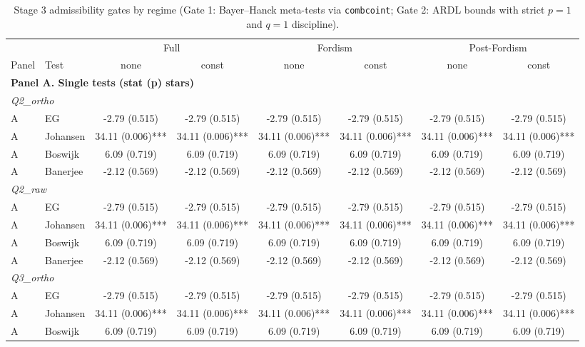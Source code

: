 \begin{table}[!ht]
\centering
\caption{Stage 3 admissibility gates by regime (Gate 1: Bayer--Hanck meta-tests via \texttt{combcoint}; Gate 2: ARDL bounds with strict $p=1$ and $q=1$ discipline).}
\label{tab:stage3_admissibility}
\scriptsize
\setlength{\tabcolsep}{3pt}
\begin{tabular}{ll|cc|cc|cc}
\hline
 &  & \multicolumn{2}{c|}{Full} & \multicolumn{2}{c|}{Fordism} & \multicolumn{2}{c}{Post-Fordism} \\
Panel & Test & none & const & none & const & none & const \\
\hline
\multicolumn{8}{l}{\textbf{Panel A. Single tests (stat (p) stars)}}\\
\hline
\multicolumn{8}{l}{\textit{Q2\_ortho}}\\
A & EG & -2.79 (0.515) & -2.79 (0.515) & -2.79 (0.515) & -2.79 (0.515) & -2.79 (0.515) & -2.79 (0.515)
\\
A & Johansen & 34.11 (0.006)*** & 34.11 (0.006)*** & 34.11 (0.006)*** & 34.11 (0.006)*** & 34.11 (0.006)*** & 34.11 (0.006)***
\\
A & Boswijk & 6.09 (0.719) & 6.09 (0.719) & 6.09 (0.719) & 6.09 (0.719) & 6.09 (0.719) & 6.09 (0.719)
\\
A & Banerjee & -2.12 (0.569) & -2.12 (0.569) & -2.12 (0.569) & -2.12 (0.569) & -2.12 (0.569) & -2.12 (0.569)
\\
\hline
\multicolumn{8}{l}{\textit{Q2\_raw}}\\
A & EG & -2.79 (0.515) & -2.79 (0.515) & -2.79 (0.515) & -2.79 (0.515) & -2.79 (0.515) & -2.79 (0.515)
\\
A & Johansen & 34.11 (0.006)*** & 34.11 (0.006)*** & 34.11 (0.006)*** & 34.11 (0.006)*** & 34.11 (0.006)*** & 34.11 (0.006)***
\\
A & Boswijk & 6.09 (0.719) & 6.09 (0.719) & 6.09 (0.719) & 6.09 (0.719) & 6.09 (0.719) & 6.09 (0.719)
\\
A & Banerjee & -2.12 (0.569) & -2.12 (0.569) & -2.12 (0.569) & -2.12 (0.569) & -2.12 (0.569) & -2.12 (0.569)
\\
\hline
\multicolumn{8}{l}{\textit{Q3\_ortho}}\\
A & EG & -2.79 (0.515) & -2.79 (0.515) & -2.79 (0.515) & -2.79 (0.515) & -2.79 (0.515) & -2.79 (0.515)
\\
A & Johansen & 34.11 (0.006)*** & 34.11 (0.006)*** & 34.11 (0.006)*** & 34.11 (0.006)*** & 34.11 (0.006)*** & 34.11 (0.006)***
\\
A & Boswijk & 6.09 (0.719) & 6.09 (0.719) & 6.09 (0.719) & 6.09 (0.719) & 6.09 (0.719) & 6.09 (0.719)

\end{tabular}
\end{table}
